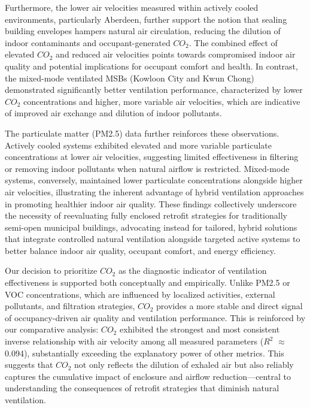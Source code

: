 \documentclass[preprint,12pt]{elsarticle}
\begin{document}
Furthermore, the lower air velocities measured within actively cooled environments, particularly Aberdeen, further support the notion that sealing building envelopes hampers natural air circulation, reducing the dilution of indoor contaminants and occupant-generated $CO_2$. The combined effect of elevated $CO_2$ and reduced air velocities points towards compromised indoor air quality and potential implications for occupant comfort and health. In contrast, the mixed-mode ventilated MSBs (Kowloon City and Kwun Chong) demonstrated significantly better ventilation performance, characterized by lower $CO_2$ concentrations and higher, more variable air velocities, which are indicative of improved air exchange and dilution of indoor pollutants.

The particulate matter (PM2.5) data further reinforces these observations. Actively cooled systems exhibited elevated and more variable particulate concentrations at lower air velocities, suggesting limited effectiveness in filtering or removing indoor pollutants when natural airflow is restricted. Mixed-mode systems, conversely, maintained lower particulate concentrations alongside higher air velocities, illustrating the inherent advantage of hybrid ventilation approaches in promoting healthier indoor air quality. These findings collectively underscore the necessity of reevaluating fully enclosed retrofit strategies for traditionally semi-open municipal buildings, advocating instead for tailored, hybrid solutions that integrate controlled natural ventilation alongside targeted active systems to better balance indoor air quality, occupant comfort, and energy efficiency.

Our decision to prioritize $CO_2$ as the diagnostic indicator of ventilation effectiveness is supported both conceptually and empirically. Unlike PM2.5 or VOC concentrations, which are influenced by localized activities, external pollutants, and filtration strategies, $CO_2$ provides a more stable and direct signal of occupancy-driven air quality and ventilation performance. This is reinforced by our comparative analysis: $CO_2$ exhibited the strongest and most consistent inverse relationship with air velocity among all measured parameters ($R^2$ $\approx$ 0.094), substantially exceeding the explanatory power of other metrics. This suggests that $CO_2$ not only reflects the dilution of exhaled air but also reliably captures the cumulative impact of enclosure and airflow reduction—central to understanding the consequences of retrofit strategies that diminish natural ventilation.
\end{document}
